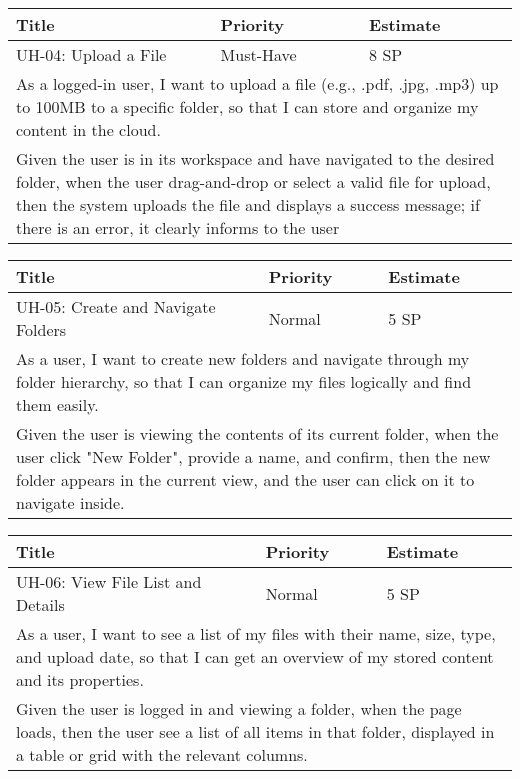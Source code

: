 \vspace{5mm}
\begin{tabular}{|p{4cm}|p{5cm}|p{5cm}|}
    \hline
    \textbf{Title} & \textbf{Priority} & \textbf{Estimate} \\
    \hline
    UH-04: Upload a File & Must-Have & 8 SP \\
    \hline
    \multicolumn{3}{|p{14cm}|}{As a logged-in user, I want to upload a file (e.g., .pdf, .jpg, .mp3) up to 100MB to a specific folder, so that I can store and organize my content in the cloud.} \\
    \hline
    \multicolumn{3}{|p{14cm}|}{Given the user is in its workspace and have navigated to the desired folder, when the user drag-and-drop or select a valid file for upload, then the system uploads the file and displays a success message; if there is an error, it clearly informs to the user} \\
    \hline
\end{tabular}

\vspace{5mm}
\begin{tabular}{|p{4cm}|p{5cm}|p{5cm}|}
    \hline
    \textbf{Title} & \textbf{Priority} & \textbf{Estimate} \\
    \hline
    UH-05: Create and Navigate Folders & Normal & 5 SP \\
    \hline
    \multicolumn{3}{|p{14cm}|}{As a user, I want to create new folders and navigate through my folder hierarchy, so that I can organize my files logically and find them easily.} \\
    \hline
    \multicolumn{3}{|p{14cm}|}{Given the user is viewing the contents of its current folder, when the user click "New Folder", provide a name, and confirm, then the new folder appears in the current view, and the user can click on it to navigate inside.} \\
    \hline
\end{tabular}

\vspace{5mm}
\begin{tabular}{|p{4cm}|p{5cm}|p{5cm}|}
    \hline
    \textbf{Title} & \textbf{Priority} & \textbf{Estimate} \\
    \hline
    UH-06: View File List and Details & Normal & 5 SP \\
    \hline
    \multicolumn{3}{|p{14cm}|}{As a user, I want to see a list of my files with their name, size, type, and upload date, so that I can get an overview of my stored content and its properties.} \\
    \hline
    \multicolumn{3}{|p{14cm}|}{Given the user is logged in and viewing a folder, when the page loads, then the user see a list of all items in that folder, displayed in a table or grid with the relevant columns.} \\
    \hline
\end{tabular}

